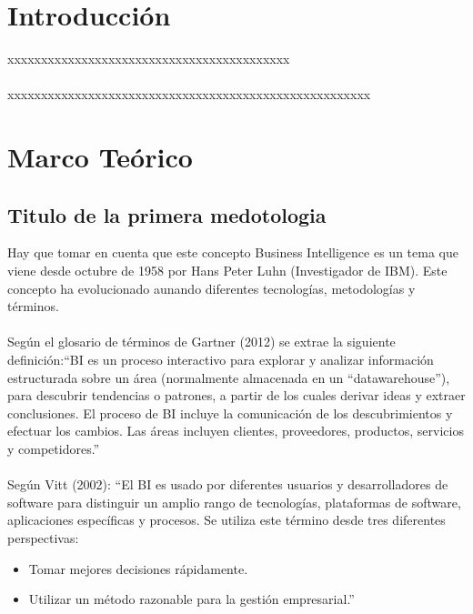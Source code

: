 \documentclass[preprint,12pt]{elsarticle}
\begin{document}
\section{Introducción}
xxxxxxxxxxxxxxxxxxxxxxxxxxxxxxxxxxxxxxxxxx
\\
\\
xxxxxxxxxxxxxxxxxxxxxxxxxxxxxxxxxxxxxxxxxxxxxxxxxxxxxx
\\



\section{Marco Teórico}

	\subsection{\textbf{Titulo de la primera medotologia}}
	Hay que tomar en cuenta que este concepto Business Intelligence es un tema que viene desde octubre de 1958 
por Hans Peter Luhn (Investigador de IBM). Este concepto ha evolucionado aunando diferentes tecnologías, metodologías
 y términos.\cite{referenciarobles1}
\\
\\
Según el glosario de términos de Gartner (2012) se extrae la siguiente definición:“BI es un proceso interactivo para explorar y analizar información estructurada sobre un área (normalmente almacenada en un “datawarehouse”), para descubrir tendencias o patrones, a partir de los cuales derivar ideas y extraer conclusiones. El proceso de BI incluye la comunicación de los descubrimientos y efectuar los cambios. Las áreas incluyen clientes, proveedores, productos, servicios y competidores.” \cite{referenciaestrella2}
\\
\\
Según Vitt (2002):
“El BI es usado por diferentes usuarios y desarrolladores de software para distinguir un amplio rango de tecnologías, plataformas de software, aplicaciones específicas y procesos. Se utiliza este término desde tres diferentes perspectivas:
	\begin{itemize}
	\item Tomar mejores decisiones rápidamente.
	\item Utilizar un método razonable para la gestión empresarial.”  \cite{referenciaestrella3} \\
	\end{itemize}
\end{document}
